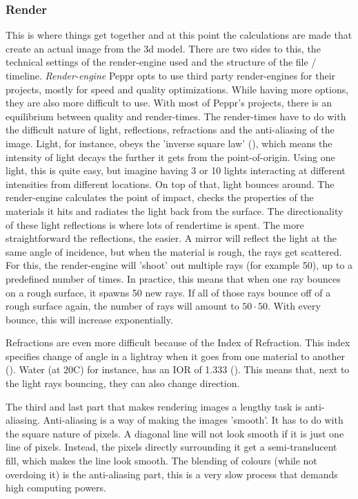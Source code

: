 \subsubsection{Render}
\label{sec:render}
This is where things get together and at this point the calculations are made that create an actual image from the 3d model. There are two sides to this, the technical settings of the render-engine used and the structure of the file / timeline.
\newline
\textit{Render-engine}
\newline
Peppr opts to use third party render-engines for their projects, mostly for speed and quality optimizations. While having more options, they are also more difficult to use. With most of Peppr's projects, there is an equilibrium between quality and render-times. The render-times have to do with the difficult nature of light, reflections, refractions and the anti-aliasing of the image. Light, for instance, obeys the 'inverse square law' (\cite{inverseLightLaw}), which means the intensity of light decays the further it gets from the point-of-origin. Using one light, this is quite easy, but imagine having 3 or 10 lights interacting at different intensities from different locations. On top of that, light bounces around. The render-engine calculates the point of impact, checks the properties of the materials it hits and radiates the light back from the surface. The directionality of these light reflections is where lots of rendertime is spent. The more straightforward the reflections, the easier. A mirror will reflect the light at the same angle of incidence, but when the material is rough, the rays get scattered. For this, the render-engine will 'shoot' out multiple rays (for example 50), up to a predefined number of times. In practice, this means that when one ray bounces on a rough surface, it spawns 50 new rays. If all of those rays bounce off of a rough surface again, the number of rays will amount to $50 \cdot 50$. With every bounce, this will increase exponentially.

Refractions are even more difficult because of the Index of Refraction. This index specifies change of angle in a lightray when it goes from one material to another (\cite{refractiveIndex}). Water (at 20\degree C) for instance, has an IOR of 1.333 (\cite{waterIOR}). This means that, next to the light rays bouncing, they can also change direction.

The third and last part that makes rendering images a lengthy task is anti-aliasing. Anti-aliasing is a way of making the images 'smooth'. It has to do with the square nature of pixels. A diagonal line will not look smooth if it is just one line of pixels. Instead, the pixels directly surrounding it get a semi-translucent fill, which makes the line look smooth. The blending of colours (while not overdoing it) is the anti-aliasing part, this is a very slow process that demands high computing powers.

